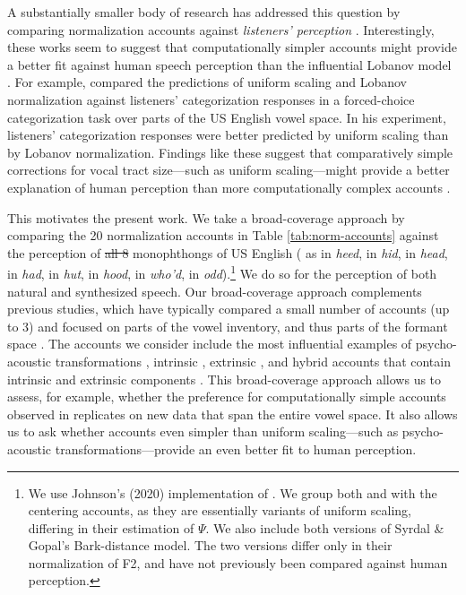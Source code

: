 \documentclass[preprint]{JASA}
\providecommand{\DIFadd}[1]{{\protect\color{blue}\uwave{#1}}} %
\providecommand{\DIFdel}[1]{{\protect\color{red}\sout{#1}}}                      %
\providecommand{\DIFaddbegin}{} %
\providecommand{\DIFaddend}{} %
\providecommand{\DIFdelbegin}{} %
\providecommand{\DIFdelend}{} %
\begin{document}
A substantially smaller body of research has addressed this question by comparing normalization accounts against \emph{listeners' perception} \citetext{\citealp{barreda-nearey2012}; \citealp{barreda2021}; \citealp{nearey1989}; \citealp{richter2017}; \citealp[for a review, see][]{whalen2016}}. Interestingly, these works seem to suggest that computationally simpler accounts might provide a better fit against human speech perception than the influential Lobanov model \citep{barreda2021, richter2017}. For example, \citet{barreda2021} compared the predictions of uniform scaling and Lobanov normalization against listeners' categorization responses in a forced-choice categorization task over parts of the US English vowel space. In his experiment, listeners' categorization responses were better predicted by uniform scaling than by Lobanov normalization. Findings like these suggest that comparatively simple corrections for vocal tract size---such as uniform scaling---might provide a better explanation of human perception than more computationally complex accounts \citep[see also][]{johnson2020, richter2017}.

This motivates the present work. We take a broad-coverage approach by comparing the 20 normalization accounts in Table \ref{tab:norm-accounts} against the perception of \DIFdelbegin \DIFdel{all 8 }\DIFdelend \DIFaddbegin \DIFadd{eight }\DIFaddend monophthongs of US English (\ipatext{[i]} as in \emph{heed}, \ipatext{[ɪ]} in \emph{hid}, \ipatext{[ɛ]} in \emph{head}, \ipatext{[æ]} in \emph{had}, \ipatext{[ʌ]} in \emph{hut}, \ipatext{[ʊ]} in \emph{hood}, \ipatext{[u]} in \emph{who'd}, \ipatext{[ɑ]} in \emph{odd}).\footnote{We use Johnson's (2020) implementation of \citet{nordstrom-lindblom1975}. We group both \citet{nordstrom-lindblom1975} and \citet{johnson2020} with the centering accounts, as they are essentially variants of uniform scaling, differing in their estimation of \(\Psi\). We also include both versions of Syrdal \& Gopal's Bark-distance model. The two versions differ only in their normalization of F2, and have not previously been compared against human perception.} We do so for the perception of both natural and synthesized speech. Our broad-coverage approach complements previous studies, which have typically compared a small number of accounts (up to 3) and focused on parts of the vowel inventory, and thus parts of the formant space \citep[typically 2-4 vowels,][]{barreda-nearey2012, barreda2021, nearey1989, richter2017}. The accounts we consider include the most influential examples of psycho-acoustic transformations \citep{glasberg-moore1990, fant2002, stevens-volkmann1940, traunmuller1981}, intrinsic \citep{syrdal-gopal1986}, extrinsic \citep{gerstman1968, johnson2020, lobanov1971, mcmurray-jongman2011, nearey1978, nordstrom-lindblom1975}, and hybrid accounts that contain intrinsic and extrinsic components \citep{miller1989}. This broad-coverage approach allows us to assess, for example, whether the preference for computationally simple accounts observed in \citet{barreda2021} replicates on new data that span the entire vowel space. It also allows us to ask whether accounts even simpler than uniform scaling---such as psycho-acoustic transformations---provide an even better fit to human perception.
\end{document}
